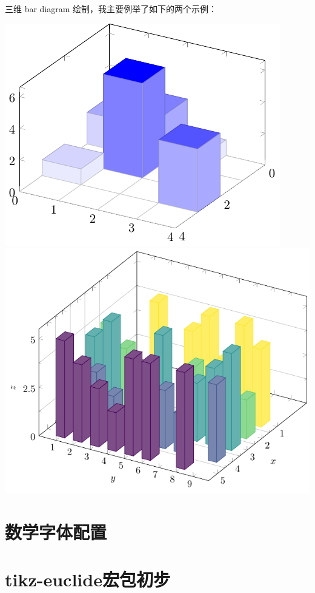 \documentclass[12pt]{article}
\begin{document}
三维  bar diagram 绘制，我主要例举了如下的两个示例：

\begin{center}
    \centering
    \includegraphics[scale=1]{./pics/fig2-1.pdf}
    \includegraphics[scale=.7]{./pics/fig2-2.pdf}
\end{center}


\section{数学字体配置}
\section{tikz-euclide宏包初步}
\end{document}
